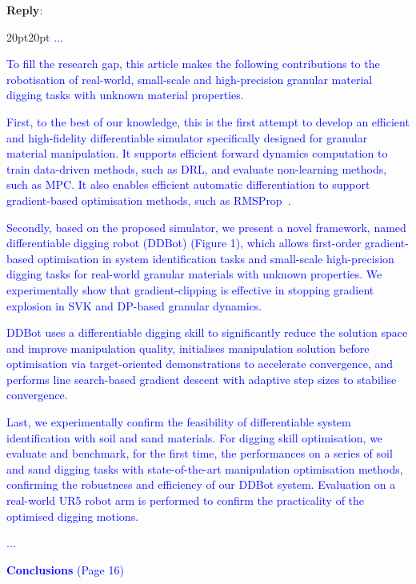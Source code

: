 \documentclass[11pt]{article}
\newenvironment{reply}
   {\medskip \noindent \begin{sf}\textbf{Reply}: \  }
   {\medskip \end{sf}}
\newcommand{\xt}[1]{\textcolor{blue}{#1}}
\begin{document}
\begin{reply}
\begin{adjustwidth}{20pt}{20pt}
\xt{...}

\xt{To fill the research gap, this article makes the following contributions to the robotisation of real-world, small-scale and high-precision granular material digging tasks with unknown material properties.}

\xt{First, to the best of our knowledge, this is the first attempt to develop an efficient and high-fidelity differentiable simulator specifically designed for granular material manipulation. It supports efficient forward dynamics computation to train data-driven methods, such as DRL, and evaluate non-learning methods, such as MPC. It also enables efficient automatic differentiation to support gradient-based optimisation methods, such as RMSProp~\cite{tieleman2012rmsprop}.}

\xt{Secondly, based on the proposed simulator, we present a novel framework, named differentiable digging robot (DDBot) (Figure 1), which allows first-order gradient-based optimisation in system identification tasks and small-scale high-precision digging tasks for real-world granular materials with unknown properties. We experimentally show that gradient-clipping is effective in stopping gradient explosion in SVK and DP-based granular dynamics.} 

\xt{DDBot uses a differentiable digging skill to significantly reduce the solution space and improve manipulation quality, initialises manipulation solution before optimisation via target-oriented demonstrations to accelerate convergence, and performs line search-based gradient descent with adaptive step sizes to stabilise convergence.}

\xt{Last, we experimentally confirm the feasibility of differentiable system identification with soil and sand materials. For digging skill optimisation, we evaluate and benchmark, for the first time, the performances on a series of soil and sand digging tasks with state-of-the-art manipulation optimisation methods, confirming the robustness and efficiency of our DDBot system. Evaluation on a real-world UR5 robot arm is performed to confirm the practicality of the optimised digging motions.}

\xt{...}

\vspace{0.3cm}\noindent\xt{\textbf{Conclusions} (Page 16)}


\end{adjustwidth}
\end{reply}
\end{document}
